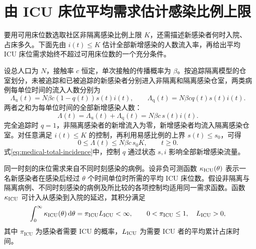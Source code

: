 \documentclass[lang=cn,a4paper,newtx]{elegantpaper}
\theoremstyle{plain}
\theoremstyle{definition}
\newcommand{\dd}{\,\mathrm d}
\begin{document}
\section{由 ICU 床位平均需求估计感染比例上限}
\label{app:medical-capacity}

要用可用床位数选取社区非隔离感染比例上限 $K$，还需描述新感染者何时入院、占床多久。下面先由 $i(t)\le K$ 估计全部新增感染的人数流入率，再给出平均 ICU 床位需求始终不超过可用床位数的一个充分条件。

设总人口为 $N$，接触率 $c$ 恒定，单次接触的传播概率为 $\beta$。按追踪隔离模型的仓室划分\parencite{Zhou2024SPCI}，未被追踪和已被追踪的新感染者分别进入非隔离和隔离感染仓室，两类病例每单位时间的流入人数分别为
\[
\Lambda_{\mathrm u}(t)=N\beta c(1-q(t))s(t)i(t),\qquad
\Lambda_{\mathrm q}(t)=N\beta cq(t)s(t)i(t).
\]
两者之和为每单位时间的全部新增感染人数：
\begin{equation}
\Lambda(t)=\Lambda_{\mathrm u}(t)+\Lambda_{\mathrm q}(t)
=N\beta c\,s(t)i(t).
\label{eq:medical-total-incidence}
\end{equation}
完全追踪时 $q=1$，非隔离感染者的新增流入为零，新增感染者均流入隔离感染仓室。对任意满足 $i(t)\le K$ 的控制，再利用易感比例的上界 $s(t)\le s_0$，可得
\begin{equation}
0\le\Lambda(t)\le N\beta c\,s_0K,\qquad t\ge0.
\label{eq:medical-incidence-bound}
\end{equation}
式\eqref{eq:medical-total-incidence}中，控制 $q$ 通过状态 $s,i$ 影响全部新增感染流量。

同一时刻的床位需求来自不同时刻感染的病例\parencite{Baas2021Occupancy}。设非负可测函数 $\kappa_{\rm ICU}(\theta)$ 表示一名新感染者在感染后经过 $\theta$ 个时间单位时所需的平均 ICU 床位数。假设非隔离与隔离病例、不同时刻感染的病例及所比较的各项控制均适用同一需求函数。函数 $\kappa_{\rm ICU}$ 可计入从感染到入院的延迟，其积分满足
\begin{equation}
\int_0^\infty\kappa_{\rm ICU}(\theta)\dd \theta=\pi_{\mathrm{ICU}}L_{\rm ICU}<\infty,
\qquad 0<\pi_{\mathrm{ICU}}\le1,\quad L_{\rm ICU}>0,
\label{eq:medical-demand-kernel}
\end{equation}
其中 $\pi_{\mathrm{ICU}}$ 为感染者需要 ICU 的概率，$L_{\rm ICU}$ 为需要 ICU 者的平均累计占床时间。
\end{document}
